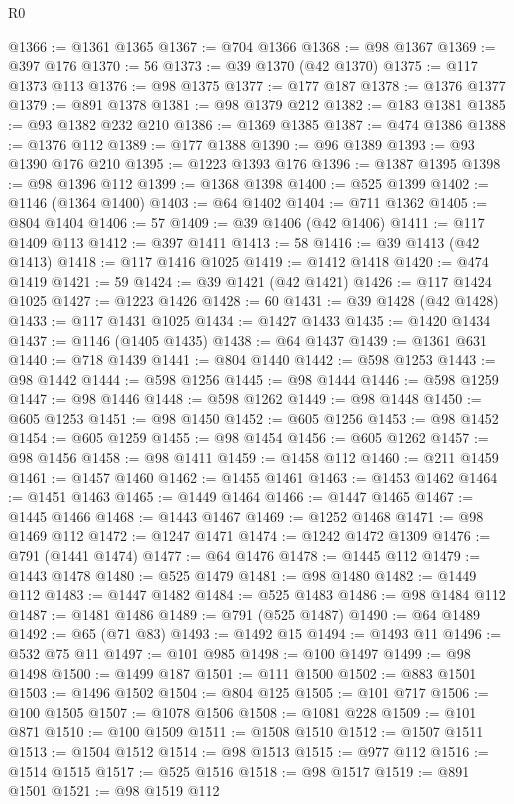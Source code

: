 \begin{lexlean}{R0}
\begin{coremodule}
@1366 := @1361 @1365
@1367 := @704 @1366
@1368 := @98 @1367
@1369 := @397 @176
@1370 := 56
@1373 := @39 @1370 (@42 @1370)
@1375 := @117 @1373 @113
@1376 := @98 @1375
@1377 := @177 @187
@1378 := @1376 @1377
@1379 := @891 @1378
@1381 := @98 @1379 @212
@1382 := @183 @1381
@1385 := @93 @1382 @232 @210
@1386 := @1369 @1385
@1387 := @474 @1386
@1388 := @1376 @112
@1389 := @177 @1388
@1390 := @96 @1389
@1393 := @93 @1390 @176 @210
@1395 := @1223 @1393 @176
@1396 := @1387 @1395
@1398 := @98 @1396 @112
@1399 := @1368 @1398
@1400 := @525 @1399
@1402 := @1146 (@1364 @1400)
@1403 := @64 @1402
@1404 := @711 @1362
@1405 := @804 @1404
@1406 := 57
@1409 := @39 @1406 (@42 @1406)
@1411 := @117 @1409 @113
@1412 := @397 @1411
@1413 := 58
@1416 := @39 @1413 (@42 @1413)
@1418 := @117 @1416 @1025
@1419 := @1412 @1418
@1420 := @474 @1419
@1421 := 59
@1424 := @39 @1421 (@42 @1421)
@1426 := @117 @1424 @1025
@1427 := @1223 @1426
@1428 := 60
@1431 := @39 @1428 (@42 @1428)
@1433 := @117 @1431 @1025
@1434 := @1427 @1433
@1435 := @1420 @1434
@1437 := @1146 (@1405 @1435)
@1438 := @64 @1437
@1439 := @1361 @631
@1440 := @718 @1439
@1441 := @804 @1440
@1442 := @598 @1253
@1443 := @98 @1442
@1444 := @598 @1256
@1445 := @98 @1444
@1446 := @598 @1259
@1447 := @98 @1446
@1448 := @598 @1262
@1449 := @98 @1448
@1450 := @605 @1253
@1451 := @98 @1450
@1452 := @605 @1256
@1453 := @98 @1452
@1454 := @605 @1259
@1455 := @98 @1454
@1456 := @605 @1262
@1457 := @98 @1456
@1458 := @98 @1411
@1459 := @1458 @112
@1460 := @211 @1459
@1461 := @1457 @1460
@1462 := @1455 @1461
@1463 := @1453 @1462
@1464 := @1451 @1463
@1465 := @1449 @1464
@1466 := @1447 @1465
@1467 := @1445 @1466
@1468 := @1443 @1467
@1469 := @1252 @1468
@1471 := @98 @1469 @112
@1472 := @1247 @1471
@1474 := @1242 @1472 @1309
@1476 := @791 (@1441 @1474)
@1477 := @64 @1476
@1478 := @1445 @112
@1479 := @1443 @1478
@1480 := @525 @1479
@1481 := @98 @1480
@1482 := @1449 @112
@1483 := @1447 @1482
@1484 := @525 @1483
@1486 := @98 @1484 @112
@1487 := @1481 @1486
@1489 := @791 (@525 @1487)
@1490 := @64 @1489
@1492 := @65 (@71 @83)
@1493 := @1492 @15
@1494 := @1493 @11
@1496 := @532 @75 @11
@1497 := @101 @985
@1498 := @100 @1497
@1499 := @98 @1498
@1500 := @1499 @187
@1501 := @111 @1500
@1502 := @883 @1501
@1503 := @1496 @1502
@1504 := @804 @125
@1505 := @101 @717
@1506 := @100 @1505
@1507 := @1078 @1506
@1508 := @1081 @228
@1509 := @101 @871
@1510 := @100 @1509
@1511 := @1508 @1510
@1512 := @1507 @1511
@1513 := @1504 @1512
@1514 := @98 @1513
@1515 := @977 @112
@1516 := @1514 @1515
@1517 := @525 @1516
@1518 := @98 @1517
@1519 := @891 @1501
@1521 := @98 @1519 @112

\end{coremodule}
\end{lexlean}
